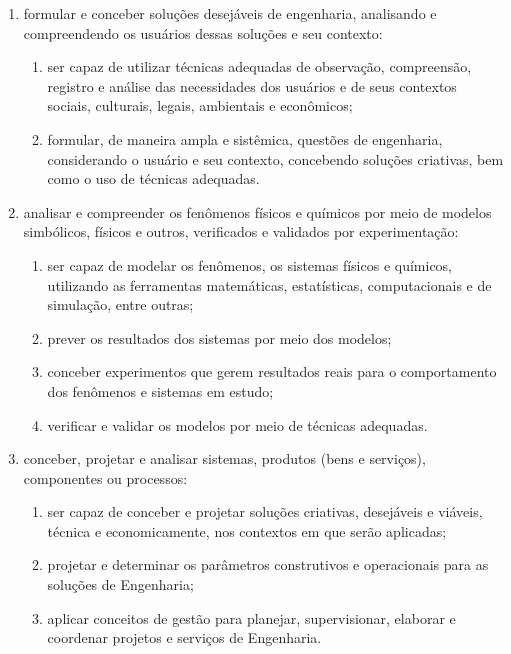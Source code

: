 \begin{citacao}
    \begin{enumerate}
        \item formular e conceber soluções desejáveis de engenharia, analisando e compreendendo os usuários dessas soluções e seu contexto:
        \begin{enumerate}
            \item ser capaz de utilizar técnicas adequadas de observação, compreensão, registro e análise das necessidades dos usuários e de seus contextos sociais, culturais, legais, ambientais e econômicos;
            \item formular, de maneira ampla e sistêmica, questões de engenharia, considerando o usuário e seu contexto, concebendo soluções criativas, bem como o uso de técnicas adequadas.
        \end{enumerate}

        \item analisar e compreender os fenômenos físicos e químicos por meio de modelos simbólicos, físicos e outros, verificados e validados por experimentação:
        \begin{enumerate}
            \item ser capaz de modelar os fenômenos, os sistemas físicos e químicos, utilizando as ferramentas matemáticas, estatísticas, computacionais e de simulação, entre outras;
            \item prever os resultados dos sistemas por meio dos modelos;
            \item conceber experimentos que gerem resultados reais para o comportamento dos fenômenos e sistemas em estudo;
            \item verificar e validar os modelos por meio de técnicas adequadas.
        \end{enumerate}

        \item conceber, projetar e analisar sistemas, produtos (bens e serviços), componentes ou processos:
        \begin{enumerate}
            \item ser capaz de conceber e projetar soluções criativas, desejáveis e viáveis, técnica e economicamente, nos contextos em que serão aplicadas;
            \item projetar e determinar os parâmetros construtivos e operacionais para as soluções de Engenharia;
            \item aplicar conceitos de gestão para planejar, supervisionar, elaborar e coordenar projetos e serviços de Engenharia.
        \end{enumerate}


\end{enumerate}
\end{citacao}
